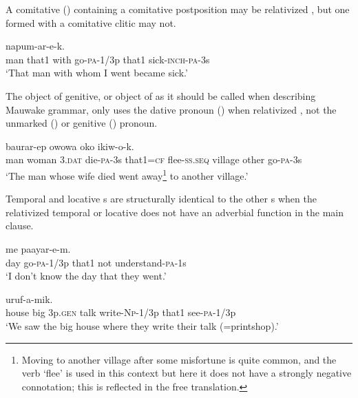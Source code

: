 A comitative  () containing a comitative postposition may be relativized , but one formed with a comitative clitic may not. 

\ea%
\label{ex:8:x1542}
  napum-ar-e-k. \\
man  that1  with  go-\textsc{pa}-1/3p  that1 sick-\textsc{inch}-\textsc{pa}-3s\\
\glt`That man with whom I went became sick.'
\z


The object of genitive, or object of  as it should be called when describing Mauwake grammar, only uses the dative pronoun () when relativized , not the unmarked () or genitive () pronoun.

\ea%
\label{ex:8:x1543}
\gll [\textbf{Mua}  emeria  \textbf{wiar}  um-o-k  nain=ke]  baurar-ep owowa  oko  ikiw-o-k.\\
man  woman  3.\textsc{dat}  die-\textsc{pa}-3s that1=\textsc{cf} flee-\textsc{ss}.\textsc{seq} village  other go-\textsc{pa}-3s\\
\glt`The man whose wife died went away\footnote{Moving to another village after some misfortune is quite common, and the verb `flee' is used in this context but here it does not have a strongly negative connotation; this is reflected in the free translation.} to another village.'
\z


Temporal and locative s are structurally identical to the other s when the relativized temporal or locative  does not have an adverbial function in the main clause. 

\ea%
\label{ex:8:x1554}
  me  paayar-e-m. \\
day  go-\textsc{pa}-1/3p  that1  not  understand-\textsc{pa}-1s\\
\glt`I don't know the day that they went.'
\z


\ea%
\label{ex:8:x1560}
  uruf-a-mik. \\
house  big  3p.\textsc{gen} talk  write-\textsc{Np}-1/3p that1  see-\textsc{pa}-1/3p\\
\glt`We saw the big house where they write their talk (=printshop).'
\z


